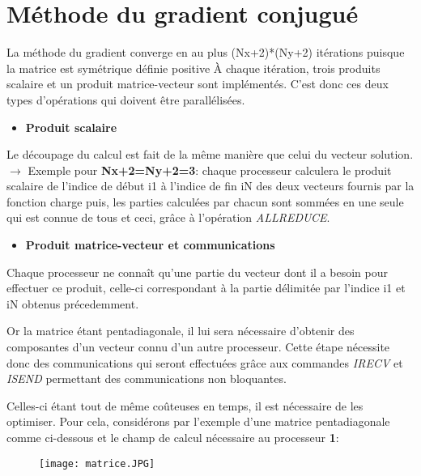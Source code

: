 \documentclass[a4paper,12pt,twoside]{report}
\begin{document}
\section{\textbf{Méthode du gradient conjugué}
}
La méthode du gradient converge en au plus (Nx+2)*(Ny+2) itérations puisque la matrice est symétrique définie positive
\`A chaque itération, trois produits scalaire   et un produit matrice-vecteur sont implémentés. C'est donc ces deux types d'opérations qui doivent être parallélisées.
\clearpage
\begin{itemize}
\item \textbf{\color{teal}Produit scalaire }
\end{itemize}



Le découpage du calcul est fait de la même manière que celui du vecteur solution.
$\rightarrow$ Exemple  pour \textbf{Nx+2=Ny+2=3}: chaque processeur calculera le produit scalaire de l'indice de début i1 à l'indice de fin iN des deux vecteurs fournis par la fonction charge puis, les parties calculées par chacun sont sommées en une seule qui est connue de tous et ceci, grâce à l'opération \textit{ALLREDUCE}.





\begin{itemize}
\item \textbf{\color{teal}Produit matrice-vecteur et communications }
\end{itemize}

Chaque processeur ne connaît qu'une partie du vecteur dont il a besoin pour effectuer ce produit, celle-ci correspondant à la partie délimitée par l'indice i1 et iN obtenus précedemment.

Or la matrice étant pentadiagonale, il lui sera nécessaire d'obtenir des composantes d'un vecteur connu d'un autre processeur. Cette étape nécessite donc des communications qui seront effectuées grâce aux commandes\textit{ IRECV} et \textit{ISEND} permettant des  communications non bloquantes.

Celles-ci étant tout de même coûteuses en temps, il est nécessaire de les optimiser. Pour cela, considérons par l'exemple d'une matrice pentadiagonale comme ci-dessous et le champ de calcul nécessaire au processeur \textbf{1}:
\begin{figure}[htpb!]
\texttt{[image: matrice.JPG]}
 

\end{figure}
\end{document}
